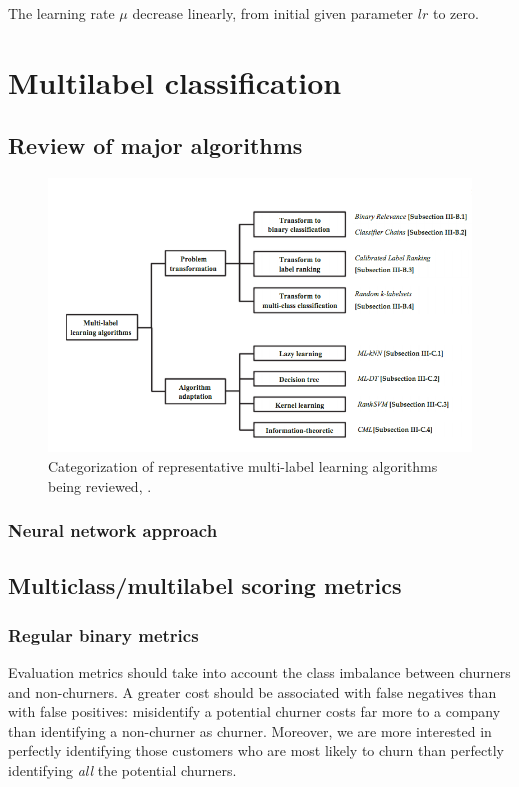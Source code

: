 The learning rate $\mu$ decrease linearly, from initial given parameter $lr$ to zero.





\pagebreak
\section{Multilabel classification}
\subsection{Review of major algorithms}

\begin{figure}[H]
\centering
\includegraphics[scale=0.45]{./images/machine-learning/multi-label-approaches.png}
\caption{Categorization of representative multi-label learning algorithms being reviewed, \cite{MultilabelReview}.}
\end{figure}

\subsubsection{Neural network approach}

\subsection{Multiclass/multilabel scoring metrics}
\subsubsection{Regular binary metrics}


Evaluation metrics should take into account the class imbalance between churners and non-churners. A greater cost should be associated with false negatives than with false positives: misidentify a potential churner costs far more to a company than identifying a non-churner as churner. Moreover, we are more interested in perfectly identifying those customers who are most likely to churn than perfectly identifying \textit{all} the potential churners.

